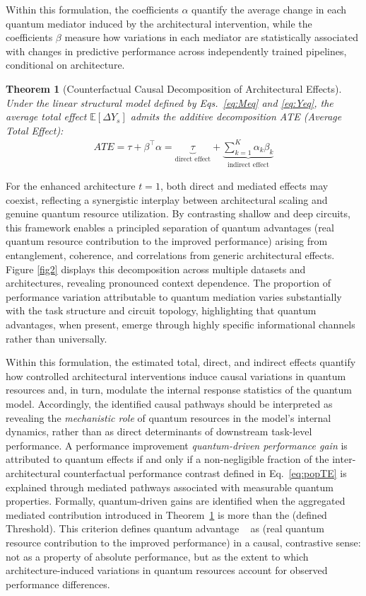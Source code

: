 \documentclass[
    reprint,
    amsmath, amssymb,
    aps,
    floatfix,
    nofootinbib
]{revtex4-1}
\newtheorem{theorem}{Theorem}
\begin{document}
Within this formulation, the coefficients $\alpha$ quantify the average change in each quantum mediator induced by the architectural intervention, while the coefficients $\beta$ measure how variations in each mediator are statistically associated with changes in predictive performance across independently trained pipelines, conditional on architecture.
\begin{theorem}[Counterfactual Causal Decomposition of Architectural Effects]
\label{thm:decomp}
Under the linear structural model defined by Eqs.~\eqref{eq:Meq} and \eqref{eq:Yeq}, the average total effect $\mathbb{E}[\Delta Y_s]$ admits the additive decomposition ATE (Average Total Effect):
\begin{align}
    ATE = \tau + \beta^\top \alpha = \underbrace{\tau}_{\text{direct effect}} + \underbrace{\sum_{k=1}^K \alpha_k \beta_k}_{\text{indirect  effect}}\label{eq:decomposition}
\end{align}
\end{theorem}

For the enhanced architecture $t=1$, both direct and mediated effects may coexist, reflecting a synergistic interplay between architectural scaling and genuine quantum resource utilization. By contrasting shallow and deep circuits, this framework enables a principled separation of quantum advantages (real quantum resource contribution to the improved performance) arising from entanglement, coherence, and correlations from generic architectural effects. Figure \ref{fig2} displays this decomposition across multiple datasets and architectures, revealing pronounced context dependence. The proportion of performance variation attributable to quantum mediation varies substantially with the task structure and circuit topology, highlighting that quantum advantages, when present, emerge through highly specific informational channels rather than universally.

Within this formulation, the estimated total, direct, and indirect effects quantify how controlled architectural interventions induce causal variations in quantum resources and, in turn, modulate the internal response statistics of the quantum model. Accordingly, the identified causal pathways should be interpreted as revealing the \emph{mechanistic role} of quantum resources in the model's internal dynamics, rather than as direct determinants of downstream task-level performance.  A performance improvement \emph{quantum-driven performance gain} is attributed to quantum effects if and only if a non-negligible fraction of the inter-architectural counterfactual performance contrast defined in Eq.~\eqref{eq:popTE} is explained through mediated pathways associated with measurable quantum properties. Formally, quantum-driven gains are identified when the aggregated mediated contribution introduced in Theorem~\ref{thm:decomp} is more than the (defined Threshold). This criterion defines quantum advantage ~\cite{schuld2021effect} as (real quantum resource contribution to the improved performance) in a causal, contrastive sense: not as a property of absolute performance, but as the extent to which architecture-induced variations in quantum resources account for observed performance differences.
\end{document}
